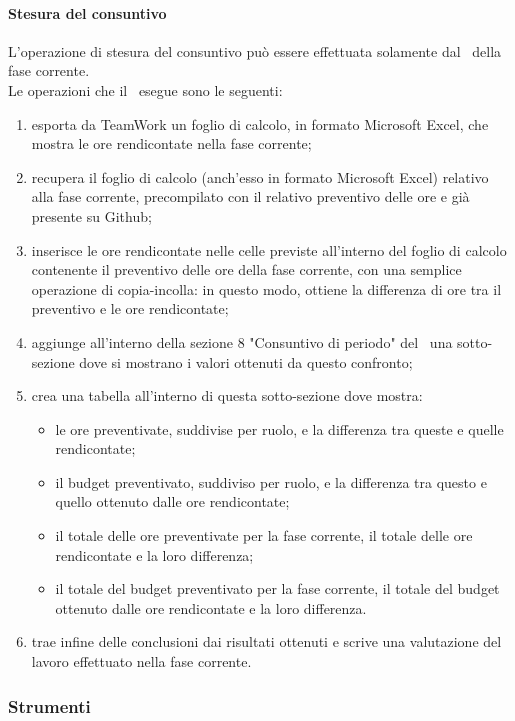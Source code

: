 \documentclass[../NormeProgetto.tex]{subfiles}
\begin{document}
			\paragraph{Stesura del consuntivo} \label{sec: Consuntivo}
				L'operazione di stesura del consuntivo può essere effettuata solamente dal \responsabilediprogetto\ della fase corrente.\\
	Le operazioni che il \responsabilediprogetto\ esegue sono le seguenti:
	\begin{enumerate}
		\item esporta da TeamWork un foglio di calcolo, in formato Microsoft Excel, che mostra le ore rendicontate nella fase corrente;
		\item recupera il foglio di calcolo (anch'esso in formato Microsoft Excel) relativo alla fase corrente, precompilato con il relativo preventivo delle ore e già presente su Github; 
		\item inserisce le ore rendicontate nelle celle previste all'interno del foglio di calcolo contenente il preventivo delle ore della fase corrente, con una semplice operazione di copia-incolla: in questo modo, ottiene la differenza di ore tra il preventivo e le ore rendicontate;
		\item aggiunge all'interno della sezione 8 "Consuntivo di periodo" del \pianodiprogetto\ una sotto-sezione dove si mostrano i valori ottenuti da questo confronto;
		\item crea una tabella all'interno di questa sotto-sezione dove mostra:
		\begin{itemize}
			\item le ore preventivate, suddivise per ruolo, e la differenza tra queste e quelle rendicontate;
			\item il budget preventivato, suddiviso per ruolo, e la differenza tra questo e quello ottenuto dalle ore rendicontate;
			\item il totale delle ore preventivate per la fase corrente, il totale delle ore rendicontate e la loro differenza;
			\item il totale del budget preventivato per la fase corrente, il totale del budget ottenuto dalle ore rendicontate e la loro differenza.
		\end{itemize}
		\item trae infine delle conclusioni dai risultati ottenuti e scrive una valutazione del lavoro effettuato nella fase corrente. 
	\end{enumerate}
		\subsubsection{Strumenti}
\end{document}
